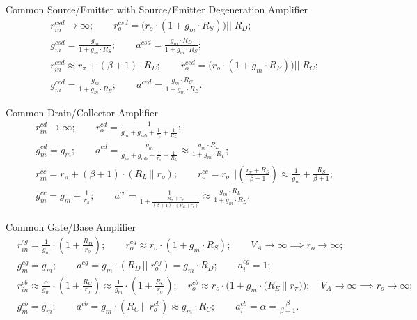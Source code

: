 \documentclass[11pt]{article}
\begin{document}
\begin{sectionbox}{Common Source/Emitter with Source/Emitter Degeneration Amplifier}
  \begin{align*}
  & r_{in}^{csd} \rightarrow \infty; \qquad 
    r_{o}^{csd} = \Big(r_o \cdot (1 + g_m \cdot R_S) \Big) \Big|\Big| \; R_D; \\[0.2em]
  & g_m^{csd} = \frac{g_m}{1 + g_m \cdot R_S}; \qquad
    a^{csd} = \frac{g_m \cdot R_D}{1 + g_m \cdot R_S}; \\[1.5em]
  & r_{in}^{ced} \approx r_{\pi} + (\beta + 1) \cdot R_E; \qquad
    r_o^{ced} = \Big(r_o \cdot (1 + g_m \cdot R_E) \Big) \Big|\Big| \; R_C; \\[0.2em]
  & g_m^{ced} = \frac{g_m}{1 + g_m \cdot R_E}; \qquad
    a^{ced} = \frac{g_m \cdot R_C}{1 + g_m \cdot R_E}.
  \end{align*}
  \end{sectionbox}

\begin{sectionbox}{Common Drain/Collector Amplifier}
\begin{align*}
& r_{in}^{cd} \rightarrow \infty; \qquad
  r_o^{cd} = \frac{1}{g_m + g_{mb} + \frac{1}{r_o} + \frac{1}{R_L}};  \\[0.2em]
& g_m^{cd} = g_m; \qquad
  a^{cd} = \frac{g_m}{g_m + g_{mb} + \frac{1}{r_o} + \frac{1}{R_L}} \approx 
  \frac{g_m \cdot R_L}{1 + g_m \cdot R_L}; \\[1.5em]
& r_{in}^{cc} = r_{\pi} + (\beta + 1) \cdot (R_L \, || \; r_o); \qquad
  r_o^{cc} = r_o \, \Big|\Big| \left( \frac{r_{\pi} + R_S}{\beta + 1} \right) \approx 
  \frac{1}{g_m} + \frac{R_S}{\beta + 1}; \\[0.2em]
& g_m^{cc} = g_m + \frac{1}{r_{\pi}}; \qquad
  a^{cc} = \frac{1}{1 + \frac{R_S + r_{\pi}}{(\beta + 1) \cdot (R_L \, || \; r_o)}} \approx 
  \frac{g_m \cdot R_L}{1 + g_m \cdot R_L}.
\end{align*}
\end{sectionbox}

\begin{sectionbox}{Common Gate/Base Amplifier}
\begin{align*}
& r_{in}^{cg} = \frac{1}{g_m} \cdot \left( 1 + \frac{R_D}{r_o} \right); \qquad 
  r_o^{cg} \approx r_o \cdot (1 + g_m \cdot R_S); \qquad 
  V_A \rightarrow \infty \implies r_o \rightarrow \infty; \\[0.2em]
& g_m^{cg} = g_m; \qquad
  a^{cg} = g_m \cdot \left( R_D \, \Big|\Big| \; r_o^{cg} \right) = 
    g_m \cdot R_D; \qquad
  a_i^{cg} = 1; \\[1.5em]
& r_{in}^{cb} \approx \frac{\alpha}{g_m} \cdot \left( 1 + \frac{R_C}{r_o} \right) \approx 
    \frac{1}{g_m} \cdot \left( 1 + \frac{R_C}{r_o} \right); \quad 
  r_o^{cb} \approx r_o \cdot \Big(1 + g_m \cdot \big( R_E \, \big|\big| \; r_{\pi} \big) \Big); \quad
  V_A \rightarrow \infty \implies r_o \rightarrow \infty; \\[0.2em]
& g_m^{cb} = g_m; \qquad
  a^{cb} = g_m \cdot \left( R_C \, \big|\big| \; r_o^{cb} \right) \approx g_m \cdot R_C; \qquad
  a_i^{cb} = \alpha = \frac{\beta}{\beta + 1}.
\end{align*}
\end{sectionbox}
\end{document}
